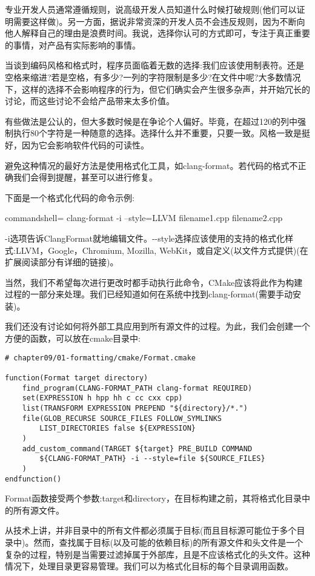 专业开发人员通常遵循规则，说高级开发人员知道什么时候打破规则(他们可以证明需要这样做)。另一方面，据说非常资深的开发人员不会违反规则，因为不断向他人解释自己的理由是浪费时间。我说，选择你认可的方式即可，专注于真正重要的事情，对产品有实际影响的事情。

当谈到编码风格和格式时，程序员面临着无数的选择:我们应该使用制表符。还是空格来缩进?若是空格，有多少?一列的字符限制是多少?在文件中呢?大多数情况下，这样的选择不会影响程序的行为，但它们确实会产生很多杂声，并开始冗长的讨论，而这些讨论不会给产品带来太多价值。

有些做法是公认的，但大多数时候是在争论个人偏好。毕竟，在超过120的列中强制执行80个字符是一种随意的选择。选择什么并不重要，只要一致。风格一致是挺好，因为它会影响软件代码的可读性。

避免这种情况的最好方法是使用格式化工具，如clang-format。若代码的格式不正确我们会得到提醒，甚至可以进行修复。

下面是一个格式化代码的命令示例:

\begin{tcblisting}{commandshell={}}
clang-format -i --style=LLVM filename1.cpp filename2.cpp
\end{tcblisting}

-i选项告诉ClangFormat就地编辑文件。-{}-style选择应该使用的支持的格式化样式:LLVM，Google，Chromium, Mozilla, WebKit，或自定义(以文件方式提供)(在扩展阅读部分有详细的链接)。

当然，我们不希望每次进行更改时都手动执行此命令，CMake应该将此作为构建过程的一部分来处理。我们已经知道如何在系统中找到clang-format(需要手动安装)。

我们还没有讨论如何将外部工具应用到所有源文件的过程。为此，我们会创建一个方便的函数，可以放在cmake目录中:

\begin{lstlisting}[style=styleCMake]
# chapter09/01-formatting/cmake/Format.cmake

function(Format target directory)
	find_program(CLANG-FORMAT_PATH clang-format REQUIRED)
	set(EXPRESSION h hpp hh c cc cxx cpp)
	list(TRANSFORM EXPRESSION PREPEND "${directory}/*.")
	file(GLOB_RECURSE SOURCE_FILES FOLLOW_SYMLINKS
		LIST_DIRECTORIES false ${EXPRESSION}
	)
	add_custom_command(TARGET ${target} PRE_BUILD COMMAND
		${CLANG-FORMAT_PATH} -i --style=file ${SOURCE_FILES}
	)
endfunction()
\end{lstlisting}

Format函数接受两个参数:target和directory，在目标构建之前，其将格式化目录中的所有源文件。

从技术上讲，并非目录中的所有文件都必须属于目标(而且目标源可能位于多个目录中)。然而，查找属于目标(以及可能的依赖目标)的所有源文件和头文件是一个复杂的过程，特别是当需要过滤掉属于外部库，且是不应该格式化的头文件。这种情况下，处理目录更容易管理。我们可以为格式化目标的每个目录调用函数。

